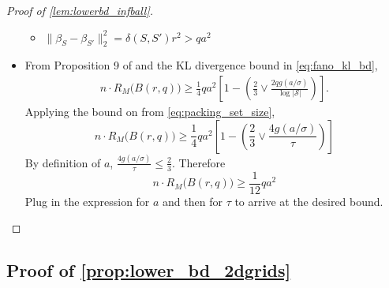 \documentclass[ejs,noshowframe]{imsart}
\theoremstyle{plain}
\theoremstyle{definition}
\newcommand{\cS}{\mathcal{S}}
\begin{document}
\begin{appendix}
\begin{proof}[Proof of \autoref{lem:lowerbd_infball}]
\begin{itemize}
\begin{itemize}
			
			
			\item $\| \beta_S - \beta_{S'} \|_2^2 = \delta(S,S') r^2 > q a^2$
			
		\end{itemize}
		
		\item 
		From Proposition 9 of \cite{birge2001gaussian} and the KL divergence bound 
		in 
		\eqref{eq:fano_kl_bd},
		\begin{align}
			n \cdot R_M \big( B(r, q) \big) \geq \frac{1}{4} q a^2 
			\left[ 1 - \left( \frac{2}{3} \vee \frac{2q g(a/\sigma)}{\log |\cS|} 
			\right)
			\right].
		\end{align}
		Applying the bound on \smash{$\log |\cS|$} from \eqref{eq:packing_set_size},
		\begin{equation}
			n \cdot R_M \big( B(r, q) \big) \geq \frac{1}{4} q a^2 
			\left[ 1 - \left( \frac{2}{3} \vee \frac{4 g(a/\sigma)}{\tau} \right)
			\right]
		\end{equation}
		By definition of $a$, $\frac{4 g(a/\sigma)}{\tau} \leq \frac{2}{3}.$ 
		Therefore
		\begin{equation}
			n \cdot R_M \big( B(r, q) \big) 
			\geq \frac{1}{12} q a^2
		\end{equation}
		Plug in the expression for $a$ and then for $\tau$ to arrive at the desired 
		bound.$\hfill\qedhere$
	\end{itemize}
\end{proof}




\subsection{Proof of \autoref{prop:lower_bd_2dgrids}}
\label{sec:lower_bd_2dgrids_proof}



\end{appendix}
\end{document}
